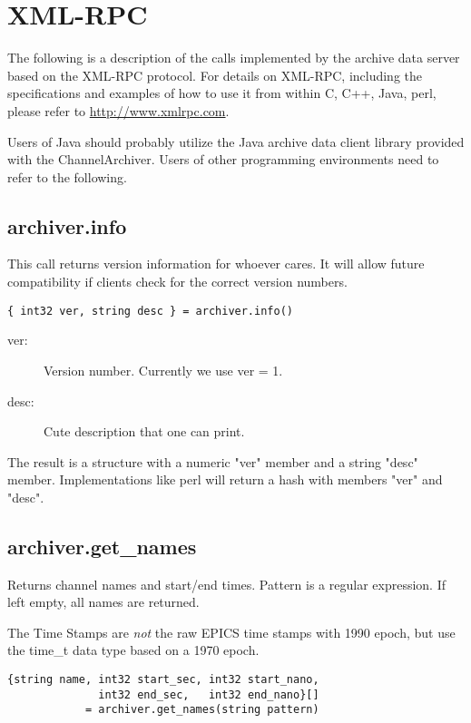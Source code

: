\section{XML-RPC}
The following is a description of the calls implemented by the archive
data server based on the XML-RPC protocol.
For details on XML-RPC, including the specifications and examples of
how to use it from within C, C++, Java, perl, please refer to
\href{http://www.xmlrpc.com}{http://www.xmlrpc.com}.

Users of Java should probably utilize the Java archive data client
library provided with the ChannelArchiver. Users of other programming
environments need to refer to the following.

\subsection{archiver.info}
This call returns version information for 
whoever cares. It will allow future compatibility
if clients check for the correct version numbers.

\begin{lstlisting}[keywordstyle=\sffamily]
{ int32 ver, string desc } = archiver.info()
\end{lstlisting}

\begin{description}
\item[\sffamily ver:]  Version number. Currently we use ver = 1.
\item[\sffamily desc:] Cute description that one can print.
\end{description}

\noindent The result is a structure with a numeric "ver"
member and a string "desc" member. Implementations
like perl will return a hash with members "ver"
and "desc".

\subsection{archiver.get\_names}
Returns channel names and start/end times.
Pattern is a regular expression.
If left empty, all names are returned.

\NOTE The Time Stamps are \emph{not} the raw EPICS time stamps with 1990 epoch,
but use the time\_t data type based on a 1970 epoch.

\begin{lstlisting}[keywordstyle=\sffamily]
{string name, int32 start_sec, int32 start_nano,
              int32 end_sec,   int32 end_nano}[] 
            = archiver.get_names(string pattern)
\end{lstlisting}

